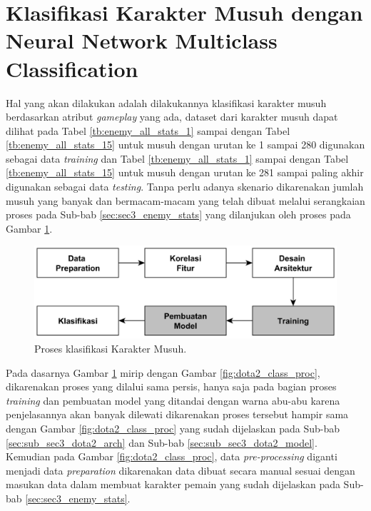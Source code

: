 \section{Klasifikasi Karakter Musuh dengan Neural Network Multiclass Classification}
\label{sec:sec3_enemy_method}
\vspace{1ex}

Hal yang akan dilakukan adalah dilakukannya klasifikasi karakter musuh berdasarkan atribut \textit{gameplay} yang ada, dataset dari karakter musuh dapat dilihat pada Tabel \ref{tb:enemy_all_stats_1} sampai dengan Tabel \ref{tb:enemy_all_stats_15} untuk musuh dengan urutan ke 1 sampai 280 digunakan sebagai data \textit{training} dan Tabel \ref{tb:enemy_all_stats_1} sampai dengan Tabel \ref{tb:enemy_all_stats_15} untuk musuh dengan urutan ke 281 sampai paling akhir digunakan sebagai data \textit{testing}. Tanpa perlu adanya skenario dikarenakan jumlah musuh yang banyak dan bermacam-macam yang telah dibuat melalui serangkaian proses pada Sub-bab \ref{sec:sec3_enemy_stats} yang dilanjukan oleh proses pada Gambar \ref{fig:enemy_class_proc}.
\vspace{1ex}

\begin{figure} [!h] \centering
	\includegraphics[scale=0.035]{img/player_char_nn_classification.png}
	\caption{Proses klasifikasi Karakter Musuh.}
	\label{fig:enemy_class_proc}
\end{figure}

Pada dasarnya Gambar \ref{fig:enemy_class_proc} mirip dengan Gambar \ref{fig:dota2_class_proc}, dikarenakan proses yang dilalui sama persis, hanya saja pada bagian proses \textit{training} dan pembuatan model yang ditandai dengan warna abu-abu karena penjelasannya akan banyak dilewati dikarenakan proses tersebut hampir sama dengan Gambar \ref{fig:dota2_class_proc} yang sudah dijelaskan pada Sub-bab \ref{sec:sub_sec3_dota2_arch} dan Sub-bab \ref{sec:sub_sec3_dota2_model}. Kemudian pada Gambar \ref{fig:dota2_class_proc}, data \textit{pre-processing} diganti menjadi data \textit{preparation} dikarenakan data dibuat secara manual sesuai dengan masukan data dalam membuat karakter pemain yang sudah dijelaskan pada Sub-bab \ref{sec:sec3_enemy_stats}.
\vspace{1ex}

